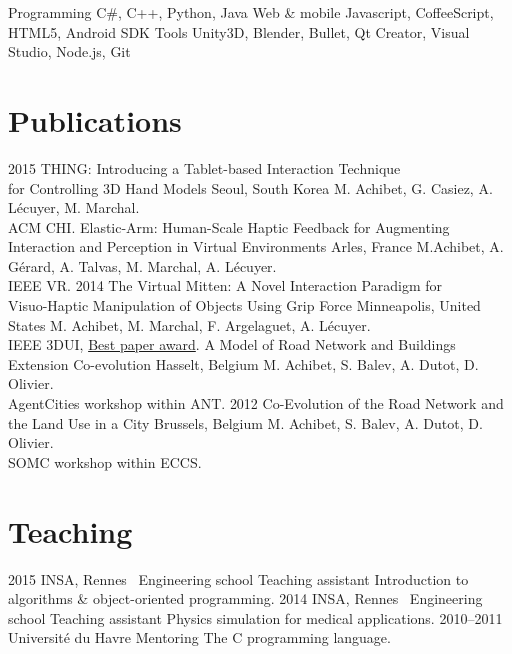 \documentclass[]{friggeri-cv}
\begin{document}
\begin{entrylist}
	\entry
		{Programming}
		{C\#, C++, Python, Java}
		{}
		{}
	\entry
		{Web \& mobile}
		{Javascript, CoffeeScript, HTML5, Android SDK}
		{}
		{}
	\entry
		{Tools}
		{Unity3D, Blender, Bullet, Qt Creator, Visual Studio, Node.js, Git}
		{}
		{}
\end{entrylist}

\section{Publications}

\begin{entrylist}
  \entry
    {2015}
    {THING: Introducing a Tablet-based Interaction Technique\\ for Controlling 3D Hand Models}
    {Seoul, South Korea}
    {M. Achibet, G. Casiez, A. Lécuyer, M. Marchal.\\ ACM CHI.}
  \entry
    {}
    {Elastic-Arm: Human-Scale Haptic Feedback for Augmenting\\ Interaction and Perception in Virtual Environments}
    {Arles, France}
    {M.Achibet, A. Gérard, A. Talvas, M. Marchal, A. Lécuyer.\\ IEEE VR.}
  \entry
    {2014}
    {The Virtual Mitten: A Novel Interaction Paradigm for\\ Visuo-Haptic Manipulation of Objects Using Grip Force}
    {Minneapolis, United States}
    {M. Achibet, M. Marchal, F. Argelaguet, A. Lécuyer.\\ IEEE 3DUI, \underline{Best paper award}.}
  \entry
    {}
    {A Model of Road Network and Buildings Extension Co-evolution}
    {Hasselt, Belgium}
    {M. Achibet, S. Balev, A. Dutot, D. Olivier.\\ AgentCities workshop within ANT.}
  \entry
    {2012}
    {Co-Evolution of the Road Network and the Land Use in a City}
    {Brussels, Belgium}
    {M. Achibet, S. Balev, A. Dutot, D. Olivier.\\ SOMC workshop within ECCS.}
\end{entrylist}

\newpage

\section{Teaching}

\begin{entrylist}
  \entry
    {2015}
    {INSA, Rennes \textemdash\ Engineering school}
    {Teaching assistant}
    {Introduction to algorithms \& object-oriented programming.}
  \entry
    {2014}
    {INSA, Rennes \textemdash\ Engineering school}
    {Teaching assistant}
    {Physics simulation for medical applications.}
  \entry
    {2010–2011}
    {Université du Havre}
    {Mentoring}
    {The C programming language.}
\end{entrylist}
\end{document}
